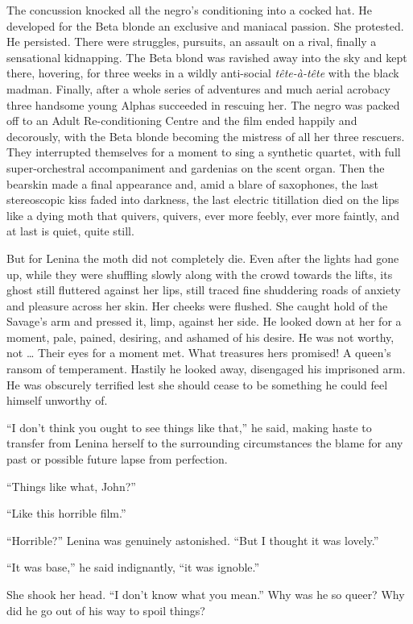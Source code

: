 \documentclass[12pt]{report}
\begin{document}
The concussion knocked all the negro's conditioning into a cocked hat.
He developed for the Beta blonde an exclusive and maniacal passion. She
protested. He persisted. There were struggles, pursuits, an assault on a
rival, finally a sensational kidnapping. The Beta blond was ravished
away into the sky and kept there, hovering, for three weeks in a wildly
anti-social \emph{tête-à-tête} with the black madman. Finally, after a
whole series of adventures and much aerial acrobacy three handsome young
Alphas succeeded in rescuing her. The negro was packed off to an Adult
Re-conditioning Centre and the film ended happily and decorously, with
the Beta blonde becoming the mistress of all her three rescuers. They
interrupted themselves for a moment to sing a synthetic quartet, with
full super-orchestral accompaniment and gardenias on the scent organ.
Then the bearskin made a final appearance and, amid a blare of
saxophones, the last stereoscopic kiss faded into darkness, the last
electric titillation died on the lips like a dying moth that quivers,
quivers, ever more feebly, ever more faintly, and at last is quiet,
quite still.

But for Lenina the moth did not completely die. Even after the lights
had gone up, while they were shuffling slowly along with the crowd
towards the lifts, its ghost still fluttered against her lips, still
traced fine shuddering roads of anxiety and pleasure across her skin.
Her cheeks were flushed. She caught hold of the Savage's arm and pressed
it, limp, against her side. He looked down at her for a moment, pale,
pained, desiring, and ashamed of his desire. He was not worthy, not
\ldots{} Their eyes for a moment met. What treasures hers promised! A
queen's ransom of temperament. Hastily he looked away, disengaged his
imprisoned arm. He was obscurely terrified lest she should cease to be
something he could feel himself unworthy of.

``I don't think you ought to see things like that,'' he said, making
haste to transfer from Lenina herself to the surrounding circumstances
the blame for any past or possible future lapse from perfection.

``Things like what, John?''

``Like this horrible film.''

``Horrible?'' Lenina was genuinely astonished. ``But I thought it was
lovely.''

``It was base,'' he said indignantly, ``it was ignoble.''

She shook her head. ``I don't know what you mean.'' Why was he so queer?
Why did he go out of his way to spoil things?
\end{document}
